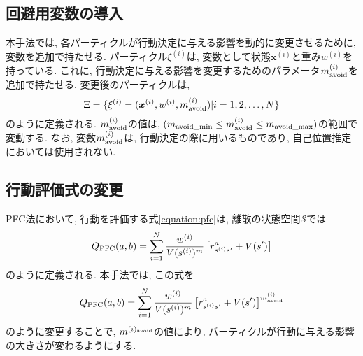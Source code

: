 \subsection{回避用変数の導入}
本手法では, 各パーティクルが行動決定に与える影響を動的に変更させるために, 変数を追加で持たせる. 
パーティクル$\xi^{(i)}$は,  変数として状態$\bm{x}^{(i)}$と重み$w^{(i)}$を持っている. 
これに, 行動決定に与える影響を変更するためのパラメータ$m^{(i)}_{\rm avoid}$を追加で持たせる. 
変更後のパーティクルは, 
\begin{equation}
\label{particles}
  \Xi = \{ \xi^{(i)} =
               (\bm{x}^{(i)}, w^{(i)}, m^{(i)}_{\rm avoid}) |i = 1,2,\dots,N \}
\end{equation}
のように定義される. 
$m^{(i)}_{\rm avoid}$の値は, $(m_{\rm avoid\_min} \leq m^{(i)}_{\rm avoid} \leq m_{\rm avoid\_max})$の範囲で変動する. 
なお, 変数$m^{(i)}_{\rm avoid}$は, 行動決定の際に用いるものであり, 自己位置推定においては使用されない. 

\subsection{行動評価式の変更}
PFC法において, 行動を評価する式\ref{equation:pfc}は, 離散の状態空間$\mathcal{S}$では
\begin{equation}
\label{equation:finite pfc}
  Q_{\rm PFC}(a, b) = \sum_{i=1}^{N} \frac{ w^{(i)} }{ V(s^{(i)})^{m} }
                      \left[r^{a}_{s^{(i)} s^{\prime}} + V(s^{\prime}) \right]
\end{equation}
のように定義される. 
本手法では, この式を
\begin{equation}
\label{equation:modified pfc}
  Q_{\rm PFC}(a, b) = \sum_{i=1}^{N} \frac{ w^{(i)} }{ V(s^{(i)})^{m} }
                      \left[r^{a}_{s^{(i)} s^{\prime}}
                            + V(s^{\prime}) \right] ^{m^{(i)}_{\rm avoid}}
\end{equation}
のように変更することで, $m^{(i)_{\rm avoid}}$の値により, パーティクルが行動に与える影響の大きさが変わるようにする. 

